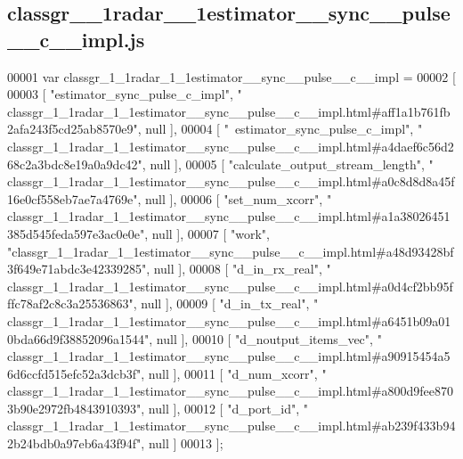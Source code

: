 \subsection{classgr\+\_\+\_\+1radar\+\_\+\_\+1estimator\+\_\+\+\_\+sync\+\_\+\+\_\+pulse\+\_\+\+\_\+c\+\_\+\+\_\+impl.\+js}
\label{classgr__1__1radar__1__1estimator____sync____pulse____c____impl_8js_source}

\begin{DoxyCode}
00001 var classgr_1_1radar_1_1estimator__sync__pulse__c__impl =
00002 [
00003     [ \textcolor{stringliteral}{"estimator\_sync\_pulse\_c\_impl"}, \textcolor{stringliteral}{"
      classgr\_1\_1radar\_1\_1estimator\_\_sync\_\_pulse\_\_c\_\_impl.html#aff1a1b761fb2afa243f5cd25ab8570e9"}, null ],
00004     [ \textcolor{stringliteral}{"~estimator\_sync\_pulse\_c\_impl"}, \textcolor{stringliteral}{"
      classgr\_1\_1radar\_1\_1estimator\_\_sync\_\_pulse\_\_c\_\_impl.html#a4daef6c56d268c2a3bdc8e19a0a9dc42"}, null ],
00005     [ \textcolor{stringliteral}{"calculate\_output\_stream\_length"}, \textcolor{stringliteral}{"
      classgr\_1\_1radar\_1\_1estimator\_\_sync\_\_pulse\_\_c\_\_impl.html#a0c8d8d8a45f16e0cf558eb7ae7a4769e"}, null ],
00006     [ \textcolor{stringliteral}{"set\_num\_xcorr"}, \textcolor{stringliteral}{"
      classgr\_1\_1radar\_1\_1estimator\_\_sync\_\_pulse\_\_c\_\_impl.html#a1a38026451385d545feda597e3ac0e0e"}, null ],
00007     [ \textcolor{stringliteral}{"work"}, \textcolor{stringliteral}{"classgr\_1\_1radar\_1\_1estimator\_\_sync\_\_pulse\_\_c\_\_impl.html#a48d93428bf3f649e71abdc3e42339285"},
       null ],
00008     [ \textcolor{stringliteral}{"d\_in\_rx\_real"}, \textcolor{stringliteral}{"
      classgr\_1\_1radar\_1\_1estimator\_\_sync\_\_pulse\_\_c\_\_impl.html#a0d4cf2bb95fffc78af2c8c3a25536863"}, null ],
00009     [ \textcolor{stringliteral}{"d\_in\_tx\_real"}, \textcolor{stringliteral}{"
      classgr\_1\_1radar\_1\_1estimator\_\_sync\_\_pulse\_\_c\_\_impl.html#a6451b09a010bda66d9f38852096a1544"}, null ],
00010     [ \textcolor{stringliteral}{"d\_noutput\_items\_vec"}, \textcolor{stringliteral}{"
      classgr\_1\_1radar\_1\_1estimator\_\_sync\_\_pulse\_\_c\_\_impl.html#a90915454a56d6ccfd515efc52a3dcb3f"}, null ],
00011     [ \textcolor{stringliteral}{"d\_num\_xcorr"}, \textcolor{stringliteral}{"
      classgr\_1\_1radar\_1\_1estimator\_\_sync\_\_pulse\_\_c\_\_impl.html#a800d9fee8703b90e2972fb4843910393"}, null ],
00012     [ \textcolor{stringliteral}{"d\_port\_id"}, \textcolor{stringliteral}{"
      classgr\_1\_1radar\_1\_1estimator\_\_sync\_\_pulse\_\_c\_\_impl.html#ab239f433b942b24bdb0a97eb6a43f94f"}, null ]
00013 ];
\end{DoxyCode}
